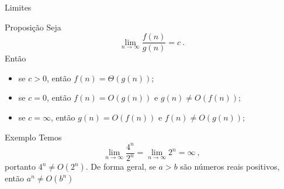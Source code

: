 \begin{frame}{Limites}

    \begin{block}{Proposição}
        Seja
        \[ \lim_{n \to \infty} \frac{f(n)}{g(n)} = c \ . \]
        Então \pause
            \begin{itemize}
                \item[(i)] se $c > 0$, então $f(n) = \Theta(g(n))$; \pause
                \item[(ii)] se $c = 0$, então $f(n) = O(g(n))$ e $g(n) \not= O(f(n))$; \pause
                \item[(iii)] se $c = \infty$, então $g(n) = O(f(n))$ e $f(n) \not= O(g(n))$; \pause
            \end{itemize}
    \end{block}


    \begin{block}{Exemplo}
            Temos
                \[\lim_{n \to \infty} \frac{4^n}{2^n} = \lim_{n \to \infty} 2^n = \infty \ ,\]
            portanto $4^n \not = O(2^n)$. De forma geral, se $a > b$ são números reais positivos, então $a^n \not=O(b^n)$
    \end{block}

\end{frame}

